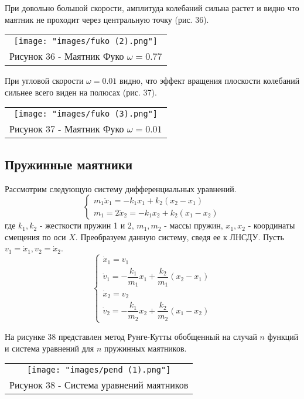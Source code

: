 При довольно большой скорости, амплитуда колебаний сильна растет и видно что маятник не проходит через центральную точку (рис. 36).
\begin{center}
  \begin{tabular}{c}
  \texttt{[image: "images/fuko (2).png"]}\\
  Рисунок 36 - Маятник Фуко $\omega=0.77$
\end{tabular}
\end{center}

При угловой скорости $\omega=0.01$ видно, что эффект вращения плоскости колебаний сильнее всего виден на полюсах (рис. 37).
\begin{center}
  \begin{tabular}{c}
  \texttt{[image: "images/fuko (3).png"]}\\
  Рисунок 37 - Маятник Фуко $\omega=0.01$
\end{tabular}
\end{center}

\subsection{Пружинные маятники}
Рассмотрим следующую систему дифференциальных уравнений.
\begin{equation}
  \begin{cases}
    m_1\ddot{x}_1=-k_1x_1+k_2(x_2-x_1)\\
    m_1=2\ddot{x}_2=-k_1x_2+k_2(x_1-x_2)
  \end{cases}
\end{equation}
где $k_1,k_2$ - жесткости пружин 1 и 2, $m_1,m_2$ - массы пружин, $x_1,x_2$ - координаты смещения по оси $X$.
Преобразуем данную систему, сведя ее к ЛНСДУ. Пусть $v_1=\dot{x}_1,v_2=\dot{x}_2$.
\begin{equation}
  \begin{cases}
    \dot{x}_1=v_1\\
    \dot{v}_1=-\dfrac{k_1}{m_1}x_1+\dfrac{k_2}{m_1}(x_2-x_1)\\
    \dot{x}_2=v_2\\
    \dot{v}_2=-\dfrac{k_1}{m_2}x_2+\dfrac{k_2}{m_2}(x_1-x_2)
  \end{cases}
\end{equation}

На рисунке 38 представлен метод Рунге-Кутты обобщенный на случай $n$ функций и система уравнений для $n$ пружинных маятников.
\begin{center}
  \begin{tabular}{c}
  \texttt{[image: "images/pend (1).png"]}\\
  Рисунок 38 - Система уравнений маятников
\end{tabular}
\end{center}

